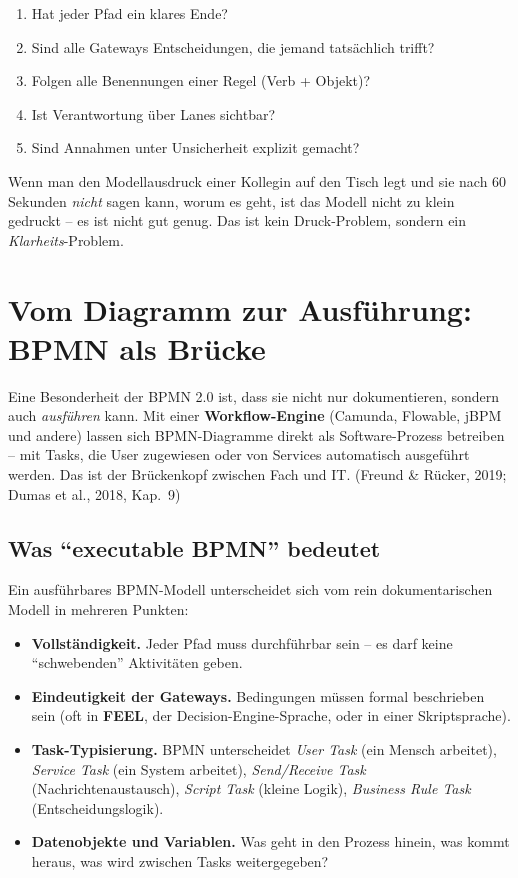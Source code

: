 \documentclass[11pt,a4paper,oneside]{article}
\newcommand{\fachbegriff}[1]{\textbf{#1}}
\newcommand{\quelle}[1]{{\footnotesize\color{lpGray}(#1)}}
\begin{document}
\begin{enumerate}
  \item Hat jeder Pfad ein klares Ende?
  \item Sind alle Gateways Entscheidungen, die jemand tatsächlich trifft?
  \item Folgen alle Benennungen einer Regel (Verb + Objekt)?
  \item Ist Verantwortung über Lanes sichtbar?
  \item Sind Annahmen unter Unsicherheit explizit gemacht?
\end{enumerate}

\begin{merkbox}
Wenn man den Modellausdruck einer Kollegin auf den Tisch legt und sie nach 60 Sekunden \emph{nicht} sagen kann, worum es geht, ist das Modell nicht zu klein gedruckt -- es ist nicht gut genug. Das ist kein Druck-Problem, sondern ein \emph{Klarheits}-Problem.
\end{merkbox}

\section{Vom Diagramm zur Ausführung: BPMN als Brücke}

Eine Besonderheit der BPMN 2.0 ist, dass sie nicht nur dokumentieren, sondern auch \emph{ausführen} kann. Mit einer \fachbegriff{Workflow-Engine} (Camunda, Flowable, jBPM und andere) lassen sich BPMN-Diagramme direkt als Software-Prozess betreiben -- mit Tasks, die User zugewiesen oder von Services automatisch ausgeführt werden. Das ist der Brückenkopf zwischen Fach und IT. \quelle{Freund \& Rücker, 2019; Dumas et al., 2018, Kap.~9}

\subsection{Was ``executable BPMN'' bedeutet}

Ein ausführbares BPMN-Modell unterscheidet sich vom rein dokumentarischen Modell in mehreren Punkten:

\begin{itemize}
  \item \textbf{Vollständigkeit.} Jeder Pfad muss durchführbar sein -- es darf keine ``schwebenden'' Aktivitäten geben.
  \item \textbf{Eindeutigkeit der Gateways.} Bedingungen müssen formal beschrieben sein (oft in \fachbegriff{FEEL}, der Decision-Engine-Sprache, oder in einer Skriptsprache).
  \item \textbf{Task-Typisierung.} BPMN unterscheidet \emph{User Task} (ein Mensch arbeitet), \emph{Service Task} (ein System arbeitet), \emph{Send/Receive Task} (Nachrichtenaustausch), \emph{Script Task} (kleine Logik), \emph{Business Rule Task} (Entscheidungslogik).
  \item \textbf{Datenobjekte und Variablen.} Was geht in den Prozess hinein, was kommt heraus, was wird zwischen Tasks weitergegeben?
\end{itemize}
\end{document}
